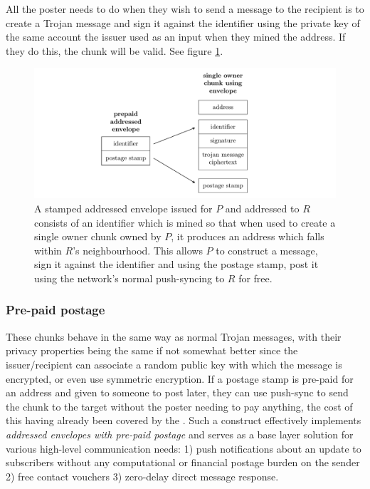 All the poster needs to do when they wish to send a message to the recipient is to create a Trojan message and sign it against the identifier using the private key of the same account the issuer used as an input when they mined the address. If they do this, the chunk will be valid. See figure \ref{fig:addressed-envelope}.


\begin{figure}[htbp]
   \centering
   \includegraphics[width=\textwidth]{fig/addressed-envelope.pdf}
   \caption[Stamped addressed envelopes \statusgreen]{A stamped addressed envelope issued for $P$ and addressed to $R$ consists of an identifier which is mined so that when used to create a single owner chunk owned by $P$, it produces an address which falls within $R$'s neighbourhood. This allows $P$ to construct a message, sign it against the identifier and using the postage stamp, post it using the network's normal push-syncing to $R$ for free. }
   \label{fig:addressed-envelope}
\end{figure}

\subsubsection{Pre-paid postage}

These chunks behave in the same way as normal Trojan messages, with their privacy properties being the same if not somewhat better since the issuer/recipient can associate a random public key with which the message is encrypted, or even use symmetric encryption. If a postage stamp is pre-paid for an address and given to someone to post later, they can use push-sync to send the chunk to the target without the poster needing to pay anything, the cost of this having already been covered by the . Such a construct effectively implements \emph{addressed envelopes with pre-paid postage} and serves as a base layer solution for various high-level communication needs: 1) push notifications about an update to subscribers without any computational or financial postage burden on the sender 2) free contact vouchers 3) zero-delay direct message response.  


